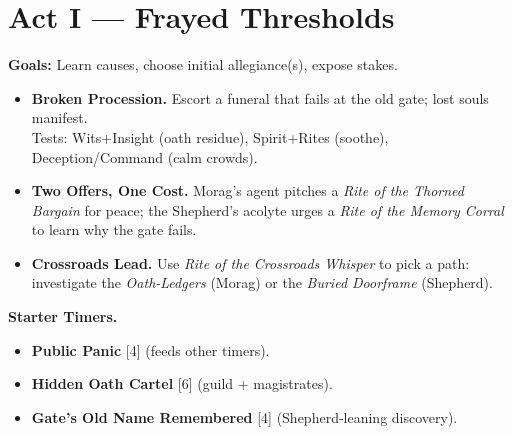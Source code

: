 \documentclass[11pt]{article}
\newcommand{\timer}[1]{\textsc{[#1]}}
\begin{document}
\section*{Act I --- Frayed Thresholds}
\textbf{Goals:} Learn causes, choose initial allegiance(s), expose stakes.
\begin{itemize}
  \item \textbf{Broken Procession.} Escort a funeral that fails at the old gate; lost souls manifest.\\
  Tests: Wits+Insight (oath residue), Spirit+Rites (soothe), Deception/Command (calm crowds).
  \item \textbf{Two Offers, One Cost.} Morag's agent pitches a \textit{Rite of the Thorned Bargain} for peace; the Shepherd's acolyte urges a \textit{Rite of the Memory Corral} to learn why the gate fails.
  \item \textbf{Crossroads Lead.} Use \textit{Rite of the Crossroads Whisper} to pick a path: investigate the \emph{Oath-Ledgers} (Morag) or the \emph{Buried Doorframe} (Shepherd).
\end{itemize}
\textbf{Starter Timers.}
\begin{itemize}
  \item \textbf{Public Panic} \timer{4} (feeds other timers).
  \item \textbf{Hidden Oath Cartel} \timer{6} (guild + magistrates).
  \item \textbf{Gate's Old Name Remembered} \timer{4} (Shepherd-leaning discovery).
\end{itemize}
\end{document}
